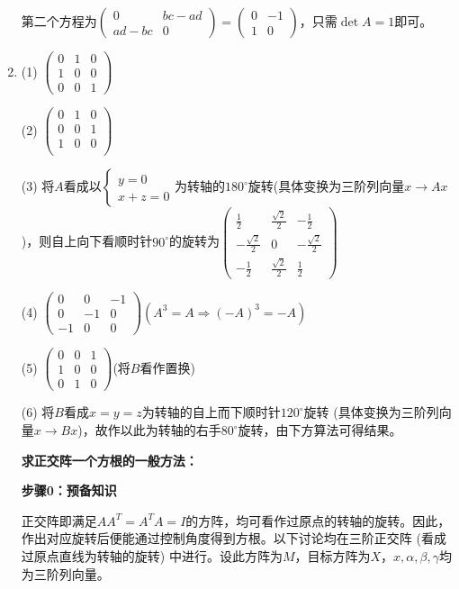 \documentclass[a4paper,UTF8,fontset=windows]{ctexart}
\begin{document}
\begin{enumerate}
第二个方程为$\begin{pmatrix}0&bc-ad\\ad-bc&0\end{pmatrix}=\begin{pmatrix}0&-1\\1&0\end{pmatrix}$，只需$\det{A}=1$即可。

\item
(1) $\begin{pmatrix}0&1&0\\1&0&0\\0&0&1\end{pmatrix}$

(2) $\begin{pmatrix}0&1&0\\0&0&1\\1&0&0\\\end{pmatrix}$

(3) 将$A$看成以$\begin{cases}y=0\\x+z=0\end{cases}$为转轴的$180^\circ$旋转(具体变换为三阶列向量$x\to Ax$)，则自上向下看顺时针$90^\circ$的旋转为$\begin{pmatrix}\frac{1}{2}&\frac{\sqrt2}{2}&-\frac{1}{2}\\[1.5ex]-\frac{\sqrt2}{2}&0&-\frac{\sqrt2}{2}\\[1.5ex]-\frac{1}{2}&\frac{\sqrt2}{2}&\frac{1}{2}\end{pmatrix}$

(4) $\begin{pmatrix}0&0&-1\\0&-1&0\\-1&0&0\end{pmatrix}(A^3=A\Rightarrow(-A)^3=-A)$

(5) $\begin{pmatrix}0&0&1\\1&0&0\\0&1&0\end{pmatrix}$(将$B$看作置换)

(6) 将$B$看成$x=y=z$为转轴的自上而下顺时针$120^\circ$旋转 (具体变换为三阶列向量$x\to Bx$)，故作以此为转轴的右手$80^\circ$旋转，由下方算法可得结果。

\textbf{求正交阵一个方根的一般方法：}

\textbf{步骤0：预备知识}

正交阵即满足$AA^T=A^TA=I$的方阵，均可看作过原点的转轴的旋转。因此，作出对应旋转后便能通过控制角度得到方根。以下讨论均在三阶正交阵 (看成过原点直线为转轴的旋转) 中进行。设此方阵为$M$，目标方阵为$X$，$x,\alpha,\beta,\gamma$均为三阶列向量。


\end{enumerate}
\end{document}
